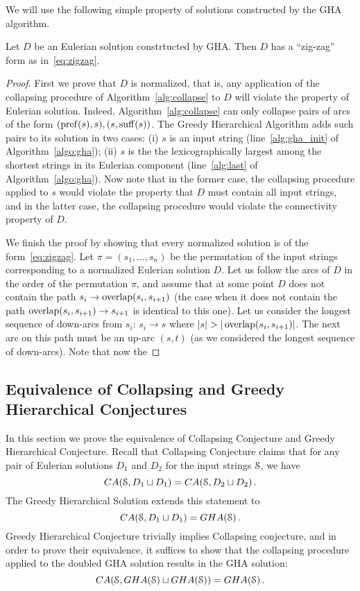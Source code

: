 We will use the following simple property of solutions constructed by the GHA algorithm.
\begin{claim}
\label{claim:zigzag}
Let $D$ be an Eulerian solution constrtucted by GHA. Then $D$ has a ``zig-zag'' form as in~\eqref{eq:zigzag}. 
\end{claim}
\begin{proof}
First we prove that $D$ is normalized, that is, any application of the collapsing procedure of Algorithm~\ref{alg:collapse} to $D$ will violate the property of Eulerian solution. Indeed, Algorithm~\ref{alg:collapse} can only collapse pairs of arcs of the form $(\operatorname{pref}(s), s), (s, \operatorname{suff}(s))$. The Greedy Hierarchical Algorithm adds such pairs to its solution in two cases: (i) $s$ is an input string (line~\ref{alg:gha_init} of Algorithm~\ref{algo:gha}); (ii) $s$ is the the lexicographically largest among the shortest strings in its Eulerian component (line~\ref{alg:last} of Algorithm~\ref{algo:gha}). Now note that in the former case, the collapsing procedure applied to $s$ would violate the property that $D$ must contain all input strings, and in the latter case, the collapsing procedure would violate the connectivity property of $D$.

We finish the proof by showing that every normalized solution is of the form~\eqref{eq:zigzag}. Let $\pi=(s_1, \dots, s_n)$ be  the permutation of the input strings corresponding to a normalized Eulerian solution $D$. Let us follow the arcs of $D$ in the order of the permutation $\pi$, and assume that at some point $D$ does not contain the path $s_i \to \operatorname{overlap}(s_i,s_{i+1})$ (the case when it does not contain the path $\operatorname{overlap}(s_i,s_{i+1})\to s_{i+1}$ is identical to this one). Let us consider the longest sequence of down-arcs from $s_i$: $s_i \to s$ where $|s|>|\overlap(s_i,s_{i+1})|$. The next arc on this path must be an up-arc $(s, t)$ (as we considered the longest sequence of down-arcs). Note that now the 
\end{proof}

\subsection{Equivalence of Collapsing and Greedy Hierarchical Conjectures}
\label{sec:equiv}
In this section we prove the equivalence of Collapsing Conjecture and Greedy Hierarchical Conjecture. Recall that Collapsing Conjecture claims that for any pair of Eulerian solutions $D_1$ and $D_2$ for the input strings ${\cal S}$, we have 
\[CA({\cal S}, D_1 \sqcup D_1) =  CA({\cal S}, D_2 \sqcup D_2)\, .\]
 The Greedy Hierarchical Solution extends this statement to 
 \[CA({\cal S}, D_1 \sqcup D_1) =  GHA(\mathcal{S}) \, .\] Greedy Hierarchical Conjecture trivially implies Collapsing conjecture, and in order to prove their equivalence, it suffices to show that the collapsing procedure applied to the doubled GHA solution results in the GHA solution: 
 \[CA({\cal S}, GHA(\mathcal{S}) \sqcup GHA(\mathcal{S})) =  GHA(\mathcal{S}) \, .\]
 
